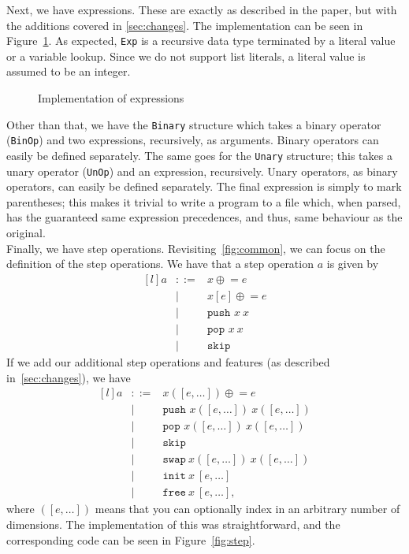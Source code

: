 \noindent Next, we have expressions. These are exactly as described in the paper, but with the additions covered in \ref{sec:changes}. The implementation can be seen in Figure~\ref{fig:exp}. As expected, \texttt{Exp} is a recursive data type terminated by a literal value or a variable lookup. Since we do not support list literals, a literal value is assumed to be an integer.

\begin{figure}[h]
  
  \caption{Implementation of expressions}\label{fig:exp}
\end{figure}

\noindent Other than that, we have the \texttt{Binary} structure which takes a binary operator (\texttt{BinOp}) and two expressions, recursively, as arguments. Binary operators can easily be defined separately. The same goes for the \texttt{Unary} structure; this takes a unary operator (\texttt{UnOp}) and an expression, recursively. Unary operators, as binary operators, can easily be defined separately. The final expression is simply to mark parentheses; this makes it trivial to write a program to a file which, when parsed, has the guaranteed same expression precedences, and thus, same behaviour as the original.\\

\noindent Finally, we have step operations. Revisiting~\ref{fig:common}, we can focus on the definition of the step operations. We have that a step operation $a$ is given by
\[
\begin{matrix*}[l]
  {a} & ::= & {x}\mathrel{\oplus}= e \\
             &  |  & {x}[ e]\mathrel{\oplus}= e \\
             &  |  & \texttt{push }{x}\ {x} \\
             &  |  & \texttt{pop  }{x}\ {x} \\
             &  |  & \texttt{skip}
\end{matrix*}
\]
If we add our additional step operations and features (as described in~\ref{sec:changes}), we have
\[
\begin{matrix*}[l]
  {a} & ::= & {x}([ e,\dots])\mathrel{\oplus}= e \\
      &  |  & \texttt{push }{x}([e,\dots])\ {x}([e,\dots]) \\
      &  |  & \texttt{pop  }{x}([e,\dots])\ {x}([e,\dots]) \\
      &  |  & \texttt{skip} \\
      &  |  & \texttt{swap} \ x([e,\dots]) \ x([e,\dots]) \\
      &  |  & \texttt{init} \ x \ [e,\dots] \\
      &  |  & \texttt{free} \ x \ [e,\dots],
\end{matrix*}
\]
where $([e,\dots])$ means that you can optionally index in an arbitrary number of dimensions. The implementation of this was straightforward, and the corresponding code can be seen in Figure~\ref{fig:step}.

